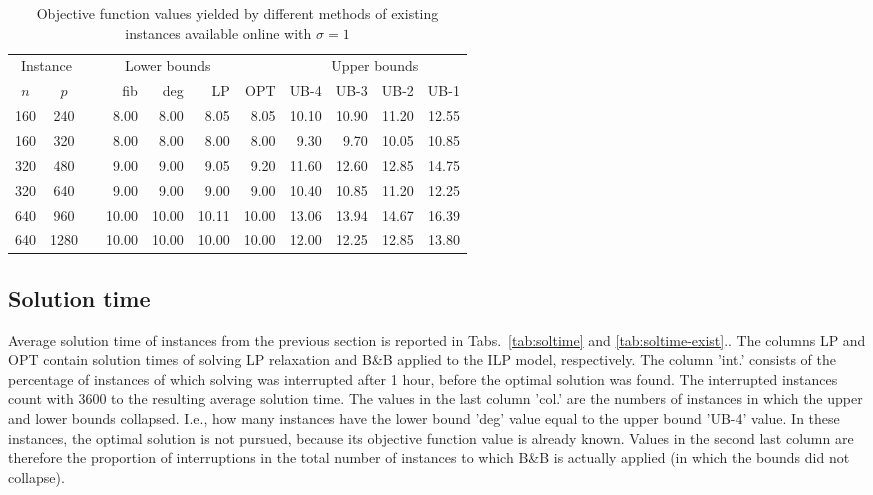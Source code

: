 \begin{table}[]
\centering
\begin{tabular}{ccrrrrrrrrr}
\multicolumn{2}{c}{Instance} & &\multicolumn{3}{c}{Lower bounds}  & &\multicolumn{4}{c}{Upper bounds} \\
\cline{1-2}\cline{4-6}\cline{8-11}
$n$ & $p$  &   & fib  & deg  & LP   & OPT & UB-4  & UB-3  & UB-2  & UB-1  \\
\hline
 160 & 240  && 8.00 & 8.00 & 8.05 & 8.05 &10.10 &10.90  &11.20  & 12.55 \\
 160 & 320  && 8.00 & 8.00 & 8.00 & 8.00 & 9.30 & 9.70  &10.05  & 10.85 \\
 320 & 480  && 9.00 & 9.00 & 9.05 & 9.20 &11.60 &12.60  &12.85  & 14.75 \\
 320 & 640  && 9.00 & 9.00 & 9.00 & 9.00 &10.40 &10.85  &11.20  & 12.25 \\
 640 & 960  &&10.00 &10.00 &10.11 &10.00 &13.06 &13.94  &14.67  & 16.39 \\
 640 &1280  &&10.00 &10.00 &10.00 &10.00 &12.00 &12.25  &12.85  & 13.80 \\
\end{tabular}
\caption{Objective function values yielded by different methods of existing instances available online with $\sigma=1$}
\label{tab:obj-exist}
\end{table}
\subsection{Solution time}

Average solution time of instances from the previous section is reported in Tabs.~\ref{tab:soltime} and \ref{tab:soltime-exist}..
The columns LP and OPT contain solution times of solving LP relaxation and B\&B applied to the ILP model, respectively.
The column 'int.' consists of the percentage of instances of which solving was interrupted after 1 hour, before the optimal solution was found.
The interrupted instances count with 3600 to the resulting average solution time.
The values in the last column 'col.' are the numbers of instances in which the upper and lower bounds collapsed. 
I.e., how many instances have the lower bound 'deg' value equal to the upper bound 'UB-4' value.
In these instances, the optimal solution is not pursued, because its objective function value is already known.
Values in the second last column are therefore the proportion of interruptions in the total number of instances to which B\&B is actually applied 
(in which the bounds did not collapse).


